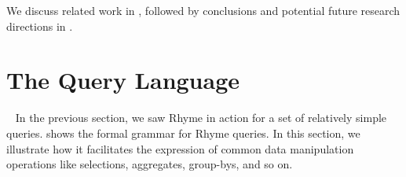 \documentclass[runningheads]{llncs}
\newcommand{\lang}{Rhyme}
\begin{document}
We discuss related work in , followed by conclusions and potential future research directions
in .


\section{The Query Language}~\label{sec:query_language}
In the previous section, we saw \lang{} in action for a set of relatively simple queries.
 shows the formal grammar for \lang{} queries.
In this section, we 
illustrate how it facilitates the expression of common data manipulation operations
like selections, aggregates, group-bys, and so on.









\end{document}
